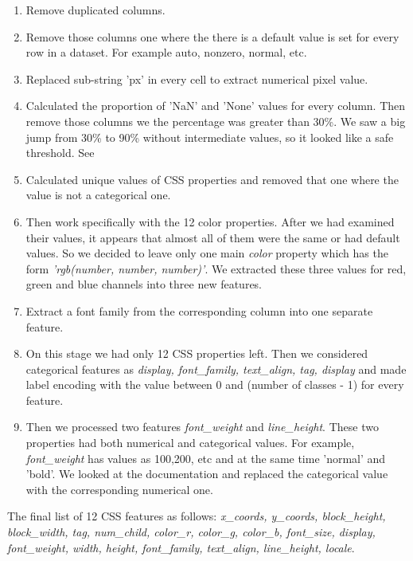 \begin{enumerate}
    \item Remove duplicated columns.
    \item Remove those columns one where the there is a default value is set for every row in a dataset. For example auto, nonzero, normal, etc. 
    \item Replaced sub-string 'px' in every cell to extract numerical pixel value.
    \item Calculated the proportion of 'NaN' and 'None' values for every column. Then remove those columns we the percentage was greater than 30\%. We saw a big jump from 30\% to 90\% without intermediate values, so it looked like a safe threshold. See 
    \item Calculated unique values of CSS properties and removed that one where the value is not a categorical one.   
    \item Then work specifically with the 12 color properties. After we had examined their values, it appears that almost all of them were the same or had default values. So we decided to leave only one main \textit{color} property which has the form \textit{'rgb(number, number, number)'}. We extracted these three values for red, green and blue channels into three new features. 
    \item Extract a font family from the corresponding column into one separate feature.
    \item On this stage we had only 12 CSS properties left. Then we considered categorical features as \textit{display, font\_family, text\_align, tag, display} and made label encoding with the value between 0 and (number of classes - 1) for every feature.
    \item Then we processed two features \textit{font\_weight} and \textit{line\_height}. These two properties had both numerical and categorical values. For example, \textit{font\_weight} has values as 100,200, etc and at the same time 'normal' and 'bold'. We looked at the documentation and replaced the categorical value with the corresponding numerical one. 
\end{enumerate}

The final list of 12 CSS features as follows: \textit{x\_coords, y\_coords, block\_height, block\_width, tag, num\_child, color\_r, color\_g, color\_b, font\_size, display, font\_weight, width, height, font\_family, text\_align, line\_height, locale}.\\

